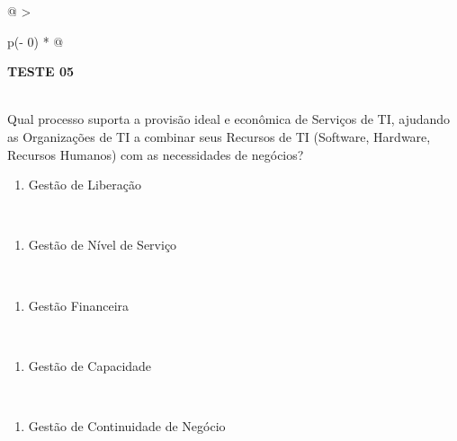 \documentclass[
]{book}
\providecommand{\tightlist}{%
  \setlength{\itemsep}{0pt}\setlength{\parskip}{0pt}}
\begin{document}
\begin{longtable}[]{@{}
  >{\raggedright\arraybackslash}p{(\columnwidth - 0\tabcolsep) * }@{}}
\toprule\noalign{}
\begin{minipage}[b]{\linewidth}\raggedright
\textbf{TESTE 05}
\end{minipage} \\
\midrule\noalign{}
\endhead
\bottomrule\noalign{}
\endlastfoot
Qual processo suporta a provisão ideal e econômica de Serviços de TI, ajudando as Organizações de TI a combinar seus Recursos de TI (Software, Hardware, Recursos Humanos) com as necessidades de negócios? \\
\begin{minipage}[t]{\linewidth}\raggedright
\begin{enumerate}
\def\labelenumi{\Alph{enumi})}
\tightlist
\item
  Gestão de Liberação
\end{enumerate}
\end{minipage} \\
\begin{minipage}[t]{\linewidth}\raggedright
\begin{enumerate}
\def\labelenumi{\Alph{enumi})}
\setcounter{enumi}{1}
\tightlist
\item
  Gestão de Nível de Serviço
\end{enumerate}
\end{minipage} \\
\begin{minipage}[t]{\linewidth}\raggedright
\begin{enumerate}
\def\labelenumi{\Alph{enumi})}
\setcounter{enumi}{2}
\tightlist
\item
  Gestão Financeira
\end{enumerate}
\end{minipage} \\
\begin{minipage}[t]{\linewidth}\raggedright
\begin{enumerate}
\def\labelenumi{\Alph{enumi})}
\setcounter{enumi}{3}
\tightlist
\item
  Gestão de Capacidade
\end{enumerate}
\end{minipage} \\
\begin{minipage}[t]{\linewidth}\raggedright
\begin{enumerate}
\def\labelenumi{\Alph{enumi})}
\setcounter{enumi}{4}
\tightlist
\item
  Gestão de Continuidade de Negócio
\end{enumerate}
\end{minipage} \\
\end{longtable}
\end{document}
